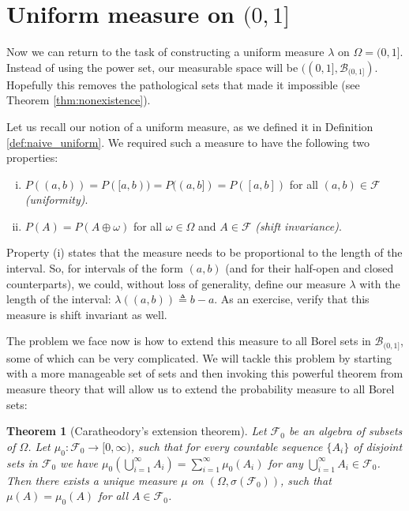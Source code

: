 \documentclass{book}
\theoremstyle{plain}%
\newtheorem{theorem}{Theorem}[section]
\theoremstyle{definition}
\newlength{\arrow}
\begin{document}
\section{Uniform measure on $(0, 1]$}

Now we can return to the task of constructing a uniform measure $\lambda$ on $\Omega = (0,1]$. Instead of using the power set, our measurable space will be $((0,1], \mathcal{B}_{(0,1]})$. Hopefully this removes the pathological sets that made it impossible (see Theorem \ref{thm:nonexistence}).

Let us recall our notion of a uniform measure, as we defined it in Definition \ref{def:naive_uniform}. We required such a measure to have the following two properties:

\begin{enumerate}[(i)]
\item $P((a,b)) = P([a,b)) = P((a,b]) = P([a,b])$ for all $(a,b) \in \mathcal{F}$ \emph{(uniformity)}.
\item $P(A) = P(A \oplus \omega)$ for all $\omega \in \Omega$ and $A \in \mathcal{F}$ \emph{(shift invariance)}.
\end{enumerate}

Property (i) states that the measure needs to be proportional to the length of the interval. So, for intervals of the form $(a,b)$ (and for their half-open and closed counterparts), we could, without loss of generality, define our measure $\lambda$ with the length of the interval: $\lambda((a,b)) \triangleq b - a$. As an exercise, verify that this measure is shift invariant as well.

The problem we face now is how to extend this measure to all Borel sets in $\mathcal{B}_{(0,1]}$, some of which can be very complicated. We will tackle this problem by starting with a more manageable set of sets and then invoking this powerful theorem from measure theory that will allow us to extend the probability measure to all Borel sets:

\begin{theorem}[Caratheodory's extension theorem]
Let $\mathcal{F}_0$ be an algebra of subsets of $\Omega$. Let $\mu_0: \mathcal{F}_0 \rightarrow [0,\infty)$, such that for every countable sequence $\{A_i\}$ of disjoint sets in $\mathcal{F}_0$ we have $\mu_0(\bigcup_{i=1}^\infty A_i) = \sum_{i=1}^\infty \mu_0(A_i)$ for any $\bigcup_{i=1}^\infty A_i \in \mathcal{F}_0$. Then there exists a unique measure $\mu$ on $(\Omega, \sigma( \mathcal{F}_0 ))$, such that $\mu(A) = \mu_0(A)$ for all $A \in \mathcal{F}_0$.
\label{thm:caratheodory}
\end{theorem}
\end{document}
